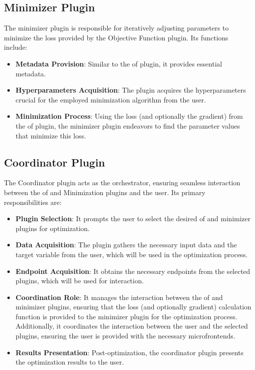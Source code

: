 \documentclass[
  a4paper,  %
  twoside,  %
  bibliography=totoc,
  headsepline,
  cleardoublepage=empty,
  parskip=half,
  draft=false
]{scrbook}
\begin{document}
\subsection{Minimizer Plugin}

The minimizer plugin is responsible for iteratively adjusting parameters to minimize the loss provided by the Objective Function plugin.
Its functions include:

\begin{itemize}
\item \textbf{Metadata Provision}: Similar to the \gls{of} plugin, it provides essential metadata.
\item \textbf{Hyperparameters Acquisition}: The plugin acquires the hyperparameters crucial for the employed minimization algorithm from the user.
\item \textbf{Minimization Process}: Using the loss (and optionally the gradient) from the \gls{of} plugin, the minimizer plugin endeavors to find the parameter values that minimize this loss.
\end{itemize}

\subsection{Coordinator Plugin}

The Coordinator plugin acts as the orchestrator, ensuring seamless interaction between the \gls{of} and Minimization plugins and the user.
Its primary responsibilities are:

\begin{itemize}
\item \textbf{Plugin Selection}: It prompts the user to select the desired \gls{of} and minimizer plugins for optimization.
\item \textbf{Data Acquisition}: The plugin gathers the necessary input data and the target variable from the user, which will be used in the optimization process.
\item \textbf{Endpoint Acquisition}: It obtains the necessary endpoints from the selected plugins, which will be used for interaction.
\item \textbf{Coordination Role}: It manages the interaction between the \gls{of} and minimizer plugins, ensuring that the loss (and optionally gradient) calculation function is provided to the minimizer plugin for the optimization process.
Additionally, it coordinates the interaction between the user and the selected plugins, ensuring the user is provided with the necessary microfrontends.
\item \textbf{Results Presentation}: Post-optimization, the coordinator plugin presents the optimization results to the user.
\end{itemize}
\end{document}
